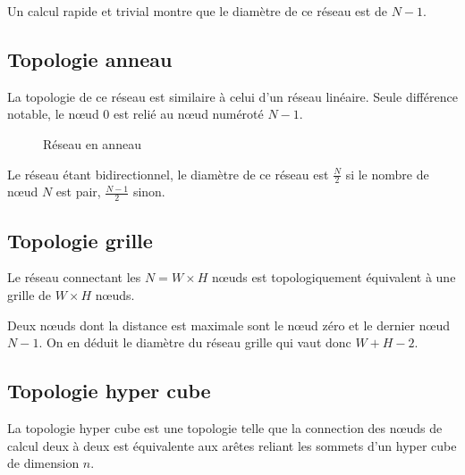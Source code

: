 \documentclass[fleqn,11pt]{article}
\begin{document}
Un calcul rapide et trivial montre que le diamètre de ce réseau est de $N-1$.

\subsection{Topologie anneau}

La topologie de ce réseau est similaire à celui d'un réseau linéaire.
Seule différence notable, le nœud 0 est relié au nœud numéroté $N-1$.

\begin{figure}
\begin{center}
\end{center}
\label{fig:resanneau}
\caption{Réseau en anneau}
\end{figure}

Le réseau étant bidirectionnel, le diamètre de ce réseau est $\frac{N}{2}$ si le nombre
de nœud $N$ est pair, $\frac{N-1}{2}$ sinon.

\subsection{Topologie grille}

Le réseau connectant les $N=W\times H$ nœuds est topologiquement équivalent à
une grille de $W\times H$ nœuds.

Deux n{\oe}uds dont la distance est maximale sont le n{\oe}ud zéro et le dernier
n{\oe}ud $N-1$. On en déduit le diamètre du réseau grille qui vaut donc $W+H-2$.

\subsection{Topologie hyper cube}

La topologie hyper cube est une topologie telle que la connection des n{\oe}uds de calcul
deux à deux est équivalente aux arêtes reliant les sommets d'un hyper cube de dimension $n$.
\end{document}
